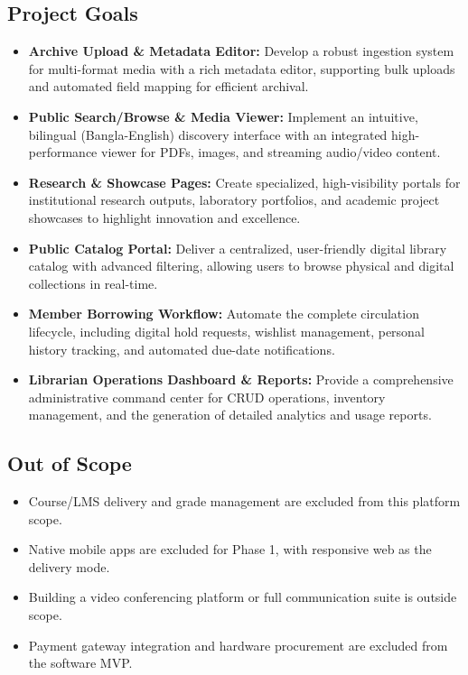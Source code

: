\documentclass[12pt,a4paper]{article}
\begin{document}
\subsection*{Project Goals}
\begin{itemize}
    \item \textbf{Archive Upload \& Metadata Editor:} Develop a robust ingestion system for multi-format media with a rich metadata editor, supporting bulk uploads and automated field mapping for efficient archival.
    \item \textbf{Public Search/Browse \& Media Viewer:} Implement an intuitive, bilingual (Bangla-English) discovery interface with an integrated high-performance viewer for PDFs, images, and streaming audio/video content.
    \item \textbf{Research \& Showcase Pages:} Create specialized, high-visibility portals for institutional research outputs, laboratory portfolios, and academic project showcases to highlight innovation and excellence.
    \item \textbf{Public Catalog Portal:} Deliver a centralized, user-friendly digital library catalog with advanced filtering, allowing users to browse physical and digital collections in real-time.
    \item \textbf{Member Borrowing Workflow:} Automate the complete circulation lifecycle, including digital hold requests, wishlist management, personal history tracking, and automated due-date notifications.
    \item \textbf{Librarian Operations Dashboard \& Reports:} Provide a comprehensive administrative command center for CRUD operations, inventory management, and the generation of detailed analytics and usage reports.
\end{itemize}

\subsection*{Out of Scope}
\begin{itemize}
    \item Course/LMS delivery and grade management are excluded from this platform scope.
    \item Native mobile apps are excluded for Phase 1, with responsive web as the delivery mode.
    \item Building a video conferencing platform or full communication suite is outside scope.
    \item Payment gateway integration and hardware procurement are excluded from the software MVP.
\end{itemize}
\newpage
\end{document}
